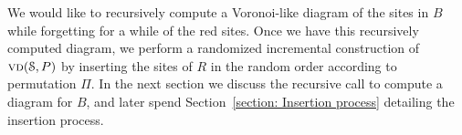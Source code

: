 \documentclass[a4paper,UKenglish]{socg-lipics-v2018}
\newcommand{\s}{\mathcal S}
\newcommand{\vd}[2][P]{\textsc{vd}(#2, #1)}
\newcommand{\exw}[1]{\textsc{E}#1}
\begin{document}
%

We would like to recursively compute a Voronoi-like diagram of the sites in $B$ while forgetting for a while of the red sites. 
Once we have this recursively computed diagram, we perform a randomized incremental construction of $\vd{\s}$ by inserting the sites of $R$ in the random order according to permutation $\Pi$.
In the next section we discuss the recursive call to compute a diagram for $B$, and later spend Section~\ref{section: Insertion process} detailing the insertion process.
\end{document}
